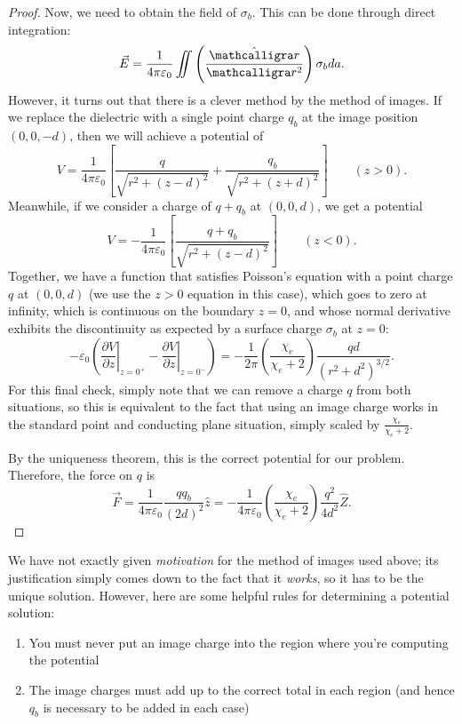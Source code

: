 \begin{proof}
Now, we need to obtain the field of $\sigma_b$. This can be done through direct integration:
\[\vec{E}=\frac{1}{4\pi\varepsilon_0}\iint \left(\frac{\hat{\scr}}{\scr^2}\right)\sigma_bda.\]
However, it turns out that there is a clever method by the method of images. If we replace the dielectric with a single point charge $q_b$ at the image position $(0,0,-d)$, then we will achieve a potential of
\[V=\frac{1}{4\pi\varepsilon_0}\left[\frac{q}{\sqrt{r^2+(z-d)^2}}+\frac{q_b}{\sqrt{r^2+(z+d)^2}}\right]\qquad (z>0).\]
Meanwhile, if we consider a charge of $q+q_b$ at $(0,0,d)$, we get a potential
\[V=-\frac{1}{4\pi\varepsilon_0}\left[\frac{q+q_b}{\sqrt{r^2+(z-d)^2}}\right]\qquad (z<0).\]
Together, we have a function that satisfies Poisson's equation with a point charge $q$ at $(0,0,d)$ (we use the $z>0$ equation in this case), which goes to zero at infinity, which is continuous on the boundary $z=0$, and whose normal derivative exhibits the discontinuity as expected by a surface charge $\sigma_b$ at $z=0$:
\[-\varepsilon_0\left(\left.\frac{\partial V}{\partial z}\right\rvert_{z=0^+}-\left.\frac{\partial V}{\partial z}\right\rvert_{z=0^-}\right)=-\frac{1}{2\pi}\left(\frac{\chi_e}{\chi_e+2}\right)\frac{qd}{(r^2+d^2)^{3/2}}.\]
For this final check, simply note that we can remove a charge $q$ from both situations, so this is equivalent to the fact that using an image charge works in the standard point and conducting plane situation, simply scaled by $\frac{\chi_e}{\chi_e+2}$.

By the uniqueness theorem, this is the correct potential for our problem. Therefore, the force on $q$ is
\[\vec{F}=\frac{1}{4\pi\varepsilon_0}\frac{qq_b}{(2d)^2}\hat{z}=\boxed{-\frac{1}{4\pi\varepsilon_0}\left(\frac{\chi_e}{\chi_e+2}\right)\frac{q^2}{4d^2}\hat{Z}}.\]
\end{proof}

\begin{remark}
We have not exactly given \textit{motivation} for the method of images used above; its justification simply comes down to the fact that it \textit{works}, so it has to be the unique solution. However, here are some helpful rules for determining a potential solution:
\begin{enumerate}
    \item You must never put an image charge into the region where you're computing the potential
    \item The image charges must add up to the correct total in each region (and hence $q_b$ is necessary to be added in each case)
\end{enumerate}
\end{remark}

